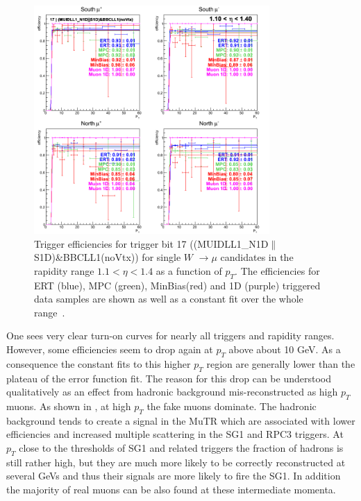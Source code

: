 \begin{figure}[ht]
  \centering
  \includegraphics[width=0.8\textwidth]{./figures/run13_trigeffipt_eta0_trig17_lin.png}
  \caption{
    Trigger efficiencies for trigger bit 17
    ((MUIDLL1\_N1D$\|$S1D)\&BBCLL1(noVtx)) for single $W$ $\rightarrow \mu$
    candidates in the rapidity range $ 1.1 < \eta < 1.4$ as a function of
    $p_T$. The efficiencies for ERT (blue), MPC (green),
    MinBias(red) and 1D (purple) triggered data samples are shown as well as a
    constant fit over the whole range~\cite{Seidl2014}.
  }
  \label{fig:run13_trigeffipt_eta0_nper0_trig17_lin} 
\end{figure}

One sees very clear turn-on curves for nearly all triggers and rapidity ranges.
However, some efficiencies seem to drop again at $p_T$ above about
10 GeV. As a consequence the constant fits to this higher $p_T$
region are generally lower than the plateau of the error function fit. The
reason for this drop can be understood qualitatively as an effect from hadronic
background mis-reconstructed as high $p_T$ muons. As shown in \cite{an1024}, at
high $p_T$ the fake muons dominate. The hadronic background tends
to create a signal in the MuTR which are associated with lower efficiencies and
increased multiple scattering in the SG1 and RPC3 triggers. At $p_T$ close to
the thresholds of SG1 and related triggers the fraction of hadrons is still
rather high, but they are much more likely to be correctly reconstructed at
several GeVs and thus their signals are more likely to fire the SG1. In addition
the majority of real muons can be also found at these intermediate momenta. 

